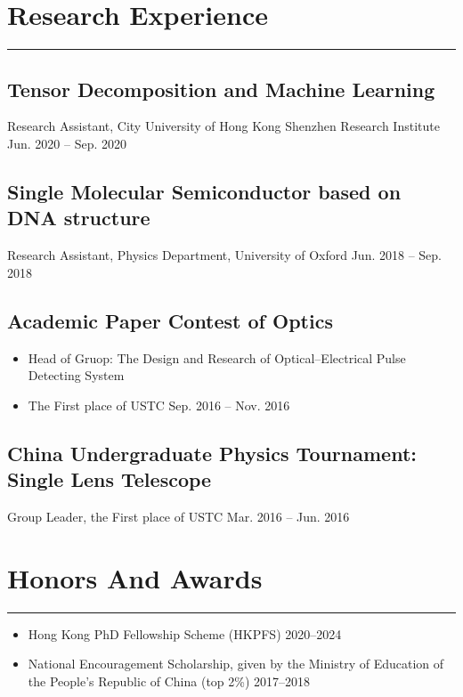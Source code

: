 \documentclass{article}
\newcommand{\cussection}[1]{\vspace{--0.05in}\section*{#1}\vspace{--0.1in} \hrule\vspace{0.2in} }
\begin{document}
\cussection{Research Experience}

\subsection*{Tensor Decomposition and Machine Learning}
Research Assistant, City University of Hong Kong Shenzhen Research Institute \hfill Jun. 2020 -- Sep. 2020

\subsection*{Single Molecular Semiconductor based on DNA structure}
Research Assistant, Physics Department, University of Oxford \hfill Jun. 2018 -- Sep. 2018

\subsection*{Academic Paper Contest of Optics}
\begin{itemize}
    \item Head of Gruop: The Design and Research of Optical--Electrical Pulse Detecting System
    \item The First place of USTC \hfill Sep. 2016 -- Nov. 2016
\end{itemize}

\subsection*{China Undergraduate Physics Tournament: Single Lens Telescope}
Group Leader, the First place of USTC \hfill Mar. 2016 -- Jun. 2016


\cussection{Honors And Awards}



\begin{itemize}
    \item Hong Kong PhD Fellowship Scheme (HKPFS) \hfill 2020--2024
    \item National Encouragement Scholarship, given by the Ministry of Education of the People’s Republic
          of China (top 2\%) \hfill 2017--2018
\end{itemize}

\end{document}
